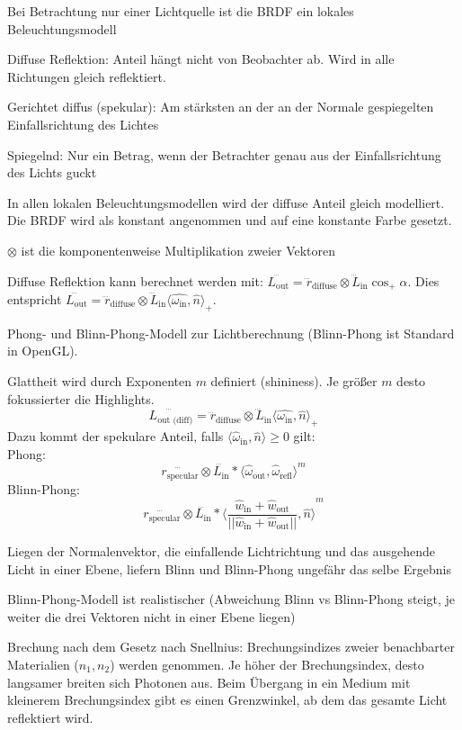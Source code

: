 \documentclass[12pt,landscape]{article}
\begin{document}
\begin{multicols}{3}
\begin{compactitem}
\item Bei Betrachtung nur einer Lichtquelle ist die BRDF ein lokales Beleuchtungsmodell
\item Diffuse Reflektion: Anteil hängt nicht von Beobachter ab. Wird in alle Richtungen gleich reflektiert.
\item Gerichtet diffus (spekular): Am stärksten an der an der Normale gespiegelten Einfallsrichtung des Lichtes
\item Spiegelnd: Nur ein Betrag, wenn der Betrachter genau aus der Einfallsrichtung des Lichts guckt
\item In allen lokalen Beleuchtungsmodellen wird der diffuse Anteil gleich modelliert. Die BRDF wird als konstant angenommen und auf eine konstante Farbe gesetzt.
\item $\otimes$ ist die komponentenweise Multiplikation zweier Vektoren
\item Diffuse Reflektion kann berechnet werden mit: $\dddot{L_\text{out}} = \dddot{r}_\text{diffuse} \otimes \dddot{L}_\text{in} \cos_{+} \alpha$. Dies entspricht $\dddot{L_\text{out}} = \dddot{r}_\text{diffuse} \otimes \dddot{L}_\text{in} {\langle \hat{\omega_{\text{in}}}, \hat{n} \rangle}_{+}$.
\item Phong- und Blinn-Phong-Modell zur Lichtberechnung (Blinn-Phong ist Standard in OpenGL).
\item Glattheit wird durch Exponenten $m$ definiert (shininess). Je größer $m$ desto fokussierter die Highlights.
\[ \dddot{L_\text{out (diff)}} = \dddot{r}_\text{diffuse} \otimes \dddot{L}_\text{in} {\langle \hat{\omega_{\text{in}}}, \hat{n} \rangle}_{+} \]
Dazu kommt der spekulare Anteil, falls $\langle \hat{\omega}_\text{in}, \hat{n} \rangle \geq 0$ gilt: \\
Phong:
\[ \dddot{r_{\text{specular}}} \otimes \dddot{L_\text{in}} * {\langle \hat{\omega}_\text{out}, \hat{\omega}_\text{refl} \rangle}^m \]
Blinn-Phong:
\[ \dddot{r_{\text{specular}}} \otimes \dddot{L_\text{in}} * {\langle \frac{\hat{w}_\text{in} + \hat{w}_\text{out}}{||\hat{w}_\text{in} + \hat{w}_\text{out}||}, \hat{n} \rangle}^m \]
\item Liegen der Normalenvektor, die einfallende Lichtrichtung und das ausgehende Licht in einer Ebene, liefern Blinn und Blinn-Phong ungefähr das selbe Ergebnis
\item Blinn-Phong-Modell ist realistischer (Abweichung Blinn vs Blinn-Phong steigt, je weiter die drei Vektoren nicht in einer Ebene liegen)
\item Brechung nach dem Gesetz nach Snellnius: Brechungsindizes zweier benachbarter Materialien ($n_1, n_2$) werden genommen. Je höher der Brechungsindex, desto langsamer breiten sich Photonen aus. Beim Übergang in ein Medium mit kleinerem Brechungsindex gibt es einen Grenzwinkel, ab dem das gesamte Licht reflektiert wird.

\end{compactitem}
\end{multicols}
\end{document}
